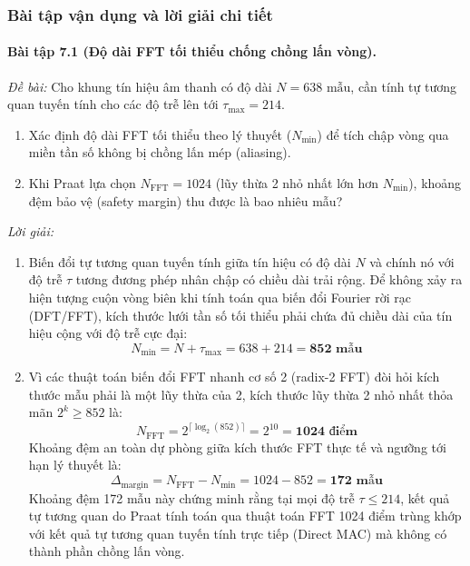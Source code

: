 \subsubsection*{Bài tập vận dụng và lời giải chi tiết}

\paragraph{Bài tập 7.1 (Độ dài FFT tối thiểu chống chồng lấn vòng).}
\textit{Đề bài:} Cho khung tín hiệu âm thanh có độ dài $N = 638\text{ mẫu}$, cần tính tự tương quan tuyến tính cho các độ trễ lên tới $\tau_{\max} = 214$.
\begin{enumerate}[label=(\alph*), itemsep=2pt]
    \item Xác định độ dài FFT tối thiểu theo lý thuyết ($N_{\text{min}}$) để tích chập vòng qua miền tần số không bị chồng lấn mép (aliasing).
    \item Khi Praat lựa chọn $N_{\text{FFT}} = 1024$ (lũy thừa 2 nhỏ nhất lớn hơn $N_{\text{min}}$), khoảng đệm bảo vệ (safety margin) thu được là bao nhiêu mẫu?
\end{enumerate}

\textit{Lời giải:}
\begin{enumerate}[label=(\alph*), itemsep=2pt]
    \item Biến đổi tự tương quan tuyến tính giữa tín hiệu có độ dài $N$ và chính nó với độ trễ $\tau$ tương đương phép nhân chập có chiều dài trải rộng. Để không xảy ra hiện tượng cuộn vòng biên khi tính toán qua biến đổi Fourier rời rạc (DFT/FFT), kích thước lưới tần số tối thiểu phải chứa đủ chiều dài của tín hiệu cộng với độ trễ cực đại:
    \begin{equation}
    N_{\text{min}} = N + \tau_{\max} = 638 + 214 = \mathbf{852\text{ mẫu}}
    \end{equation}
    
    \item Vì các thuật toán biến đổi FFT nhanh cơ số 2 (radix-2 FFT) đòi hỏi kích thước mẫu phải là một lũy thừa của 2, kích thước lũy thừa 2 nhỏ nhất thỏa mãn $2^k \ge 852$ là:
    \begin{equation}
    N_{\text{FFT}} = 2^{\lceil \log_2(852) \rceil} = 2^{10} = \mathbf{1024\text{ điểm}}
    \end{equation}
    Khoảng đệm an toàn dự phòng giữa kích thước FFT thực tế và ngưỡng tới hạn lý thuyết là:
    \begin{equation}
    \Delta_{\text{margin}} = N_{\text{FFT}} - N_{\text{min}} = 1024 - 852 = \mathbf{172\text{ mẫu}}
    \end{equation}
    Khoảng đệm 172 mẫu này chứng minh rằng tại mọi độ trễ $\tau \le 214$, kết quả tự tương quan do Praat tính toán qua thuật toán FFT 1024 điểm trùng khớp với kết quả tự tương quan tuyến tính trực tiếp (Direct MAC) mà không có thành phần chồng lấn vòng.
\end{enumerate}

